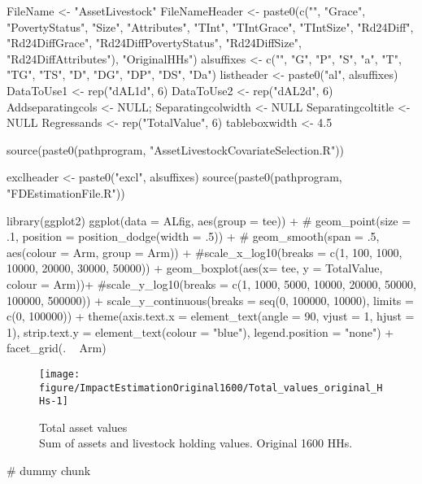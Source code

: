 \begin{Schunk}
\begin{Sinput}
FileName <- "AssetLivestock"
FileNameHeader <- 
  paste0(c("", "Grace", "PovertyStatus", "Size", "Attributes",
    "TInt", "TIntGrace", "TIntSize", "Rd24Diff", "Rd24DiffGrace", 
    "Rd24DiffPovertyStatus", "Rd24DiffSize", "Rd24DiffAttributes"), "OriginalHHs")
alsuffixes <- c("", "G", "P", "S", "a", "T", "TG", "TS", "D", "DG", "DP", "DS", "Da")
listheader <- paste0("al", alsuffixes)
DataToUse1 <- rep("dAL1d", 6)
DataToUse2 <- rep("dAL2d", 6)
Addseparatingcols <- NULL; Separatingcolwidth <- NULL
Separatingcoltitle <- NULL
Regressands <- rep("TotalValue", 6)
tableboxwidth <- 4.5
\end{Sinput}
\end{Schunk}
\begin{Schunk}
\begin{Sinput}
source(paste0(pathprogram, "AssetLivestockCovariateSelection.R"))
\end{Sinput}
\end{Schunk}
\begin{Schunk}
\begin{Sinput}
exclheader <- paste0("excl", alsuffixes)
source(paste0(pathprogram, "FDEstimationFile.R"))
\end{Sinput}
\end{Schunk}
\begin{Schunk}
\begin{Sinput}
library(ggplot2)
ggplot(data = ALfig, aes(group = tee)) + 
#  geom_point(size = .1, position = position_dodge(width = .5)) +
#  geom_smooth(span = .5, aes(colour = Arm, group = Arm)) +
  #scale_x_log10(breaks = c(1, 100, 1000, 10000, 20000, 30000, 50000)) +
  geom_boxplot(aes(x= tee, y = TotalValue, colour = Arm))+
  #scale_y_log10(breaks = c(1, 1000, 5000, 10000, 20000, 50000, 100000, 500000)) +
  scale_y_continuous(breaks = seq(0, 100000, 10000), limits = c(0, 100000)) +
  theme(axis.text.x = element_text(angle = 90, vjust = 1, hjust = 1), 
   strip.text.y = element_text(colour = "blue"), legend.position = "none") +
  facet_grid(. ~ Arm)
\end{Sinput}
\begin{figure}

{\centering \texttt{[image: figure/ImpactEstimationOriginal1600/Total\_values\_original\_HHs-1]} 

}

\caption{Total asset values\\ {\footnotesize Sum of assets and livestock holding values. Original 1600 HHs.\setlength{\baselineskip}{8pt}}}\label{Figure Total values original HHs}
\end{figure}
\end{Schunk}
\begin{Schunk}
\begin{Sinput}
# dummy chunk
\end{Sinput}
\end{Schunk}

